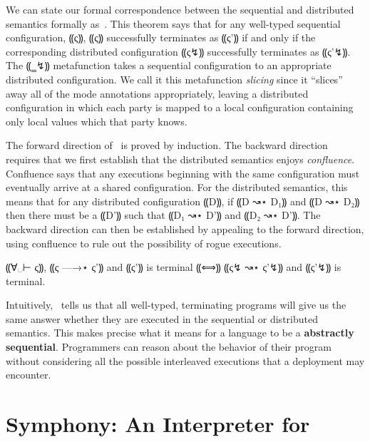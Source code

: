 We can state our formal correspondence between the sequential and distributed semantics formally
as~. This theorem says that for any well-typed sequential configuration,
⸨ς⸩, ⸨ς⸩ successfully terminates as ⸨ς'⸩ if and only if the corresponding distributed configuration
⸨ς↯⸩ successfully terminates as ⸨ς'↯⸩. The ⸨‗↯⸩ metafunction takes a sequential configuration to an
appropriate distributed configuration. We call it this metafunction \emph{slicing} since it ``slices''
away all of the mode annotations appropriately, leaving a distributed configuration in which each
party is mapped to a local configuration containing only local values which that party knows.

The forward direction of~ is proved by induction. The backward direction
requires that we first establish that the distributed semantics enjoys \emph{confluence}. Confluence
says that any executions beginning with the same configuration must eventually arrive at a shared
configuration. For the distributed semantics, this means that for any distributed configuration ⸨D⸩,
if ⸨D ↝⋆ D₁⸩ and ⸨D ↝⋆ D₂⸩ then there must be a ⸨D'⸩ such that ⸨D₁ ↝⋆ D'⸩ and ⸨D₂ ↝⋆ D'⸩. The backward
direction can then be established by appealing to the forward direction, using confluence to rule out the
possibility of rogue executions.

\begin{theorem} \label{thm:mpc-simulation}
  ⸨∀␣⊢ ς⸩, ⸨ς —→⋆ ς'⸩ and ⸨ς'⸩ is terminal ⸨⟺⸩ ⸨ς↯ ↝⋆ ς'↯⸩ and ⸨ς'↯⸩ is terminal.
\end{theorem}

Intuitively,~ tells us that all well-typed, terminating programs
will give us the same answer whether they are executed in the sequential or distributed semantics.
This makes precise what it means for a language to be a \textbf{abstractly sequential}. Programmers
can reason about the behavior of their program without considering all the possible interleaved
executions that a deployment may encounter.

\section{Symphony: An Interpreter for \mpc}

